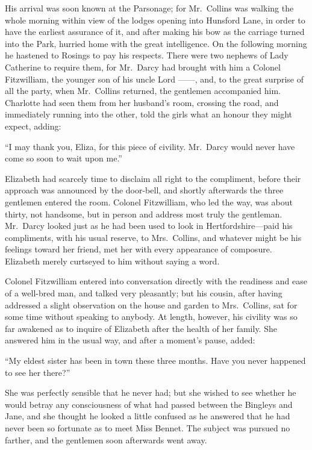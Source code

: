 \documentclass[12pt,english,oneside]{book}
\begin{document}
His arrival was soon known at the Parsonage; for Mr.\ Collins was
walking the whole morning within view of the lodges opening into Hunsford
Lane, in order to have the earliest assurance of it, and after making
his bow as the carriage turned into the Park, hurried home with the
great intelligence. On the following morning he hastened to Rosings
to pay his respects. There were two nephews of Lady Catherine to require
them, for Mr.\ Darcy had brought with him a Colonel Fitzwilliam,
the younger son of his uncle Lord \mbox{------}, and, to the great
surprise of all the party, when Mr.\ Collins returned, the gentlemen
accompanied him. Charlotte had seen them from her husband's room,
crossing the road, and immediately running into the other, told the
girls what an honour they might expect, adding:

{}``I may thank you, Eliza, for this piece of civility. Mr.\ Darcy
would never have come so soon to wait upon me.''

Elizabeth had scarcely time to disclaim all right to the compliment,
before their approach was announced by the door-bell, and shortly
afterwards the three gentlemen entered the room. Colonel Fitzwilliam,
who led the way, was about thirty, not handsome, but in person and
address most truly the gentleman. Mr.\ Darcy looked just as he had
been used to look in Hertfordshire\mbox{---}paid his compliments,
with his usual reserve, to Mrs.\ Collins, and whatever might be his
feelings toward her friend, met her with every appearance of composure.
Elizabeth merely curtseyed to him without saying a word.

Colonel Fitzwilliam entered into conversation directly with the readiness
and ease of a well-bred man, and talked very pleasantly; but his cousin,
after having addressed a slight observation on the house and garden
to Mrs.\ Collins, sat for some time without speaking to anybody.
At length, however, his civility was so far awakened as to inquire
of Elizabeth after the health of her family. She answered him in the
usual way, and after a moment's pause, added:

{}``My eldest sister has been in town these three months. Have you
never happened to see her there?''\ 

She was perfectly sensible that he never had; but she wished to see
whether he would betray any consciousness of what had passed between
the Bingleys and Jane, and she thought he looked a little confused
as he answered that he had never been so fortunate as to meet Miss
Bennet. The subject was pursued no farther, and the gentlemen soon
afterwards went away.
\end{document}

